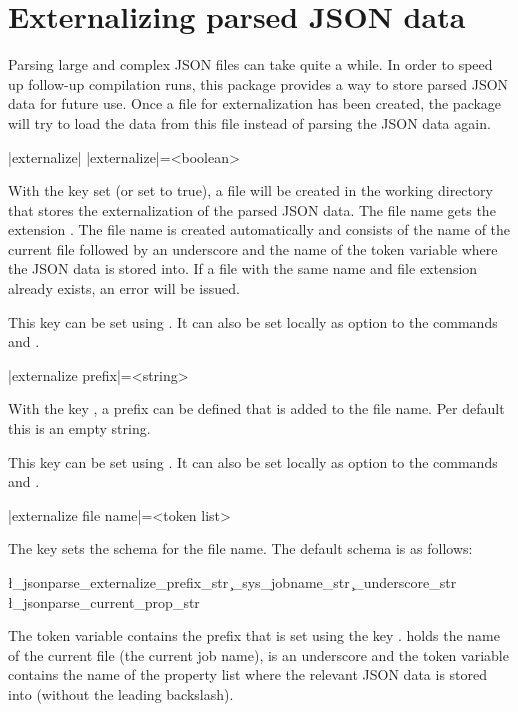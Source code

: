 \documentclass[a4paper]{article}
\begin{document}
{{\section{Externalizing parsed JSON data}\label{sec:externalizing}

Parsing large and complex JSON files can take quite a while. In order to speed up follow-up compilation runs, this package provides a way to store parsed JSON data for future use. Once a file for externalization has been created, the package will try to load the data from this file instead of parsing the JSON data again.

\begin{macrodef}
|externalize|
|externalize|={<boolean>}
\end{macrodef}
With the key  set (or set to true), a file will be created in the working directory that stores the externalization of the parsed JSON data. The file name gets the extension . The file name is created automatically and consists of the name of the current file followed by an underscore and the name of the token variable where the JSON data is stored into. If a file with the same name and file extension already exists, an error will be issued.

This key can be set using \macro{\JSONParseSet}. It can also be set locally as option to the commands \macro{\JSONParse} and \macro{\JSONParseFromFile}.

\begin{macrodef}
|externalize prefix|={<string>}
\end{macrodef}
With the key , a prefix can be defined that is added to the file name. Per default this is an empty string.

This key can be set using \macro{\JSONParseSet}. It can also be set locally as option to the commands \macro{\JSONParse} and \macro{\JSONParseFromFile}.

\begin{macrodef}
|externalize file name|={<token list>}
\end{macrodef}
The key  sets the schema for the file name. The default schema is as follows:

\begin{codeexample}
\l_jsonparse_externalize_prefix_str \c_sys_jobname_str
  \c_underscore_str \l_jsonparse_current_prop_str
\end{codeexample}

The token variable  contains the prefix that is set using the key .  holds the name of the current file (the current job name),  is an underscore and the token variable  contains the name of the property list where the relevant JSON data is stored into (without the leading backslash).

}}
\end{document}
